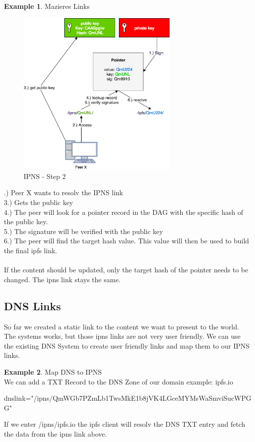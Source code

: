 \documentclass[a4paper,11pt, oneside]{report}
\theoremstyle{definition}
\newtheorem{exmp}{Example}[subsection]
\begin{document}
\begin{exmp}{Mazieres Links}
\begin{figure}[H]
\centering
\includegraphics[width=0.7\textwidth]{img/ipns-2.png}
\caption[IPNS Step 2]{IPNS - Step 2}
\end{figure}
.) Peer X wants to resolv the IPNS link\\
3.) Gets the public key\\
4.) The peer will look for a pointer record in the DAG with the specific hash of the public key. \\
5.) The signature will be verified with the public key\\
6.) The peer will find the target hash value. This value will then be used to build the final ipfs link. \\ \\
If the content should be updated, only the target hash of the pointer needs to be changed. The ipns link stays the same.


\end{exmp}

\newpage
\subsection{DNS Links}
So far we created a static link to the content we want to present to the world. The systems works, but those ipns links are not very user friendly. We can use the existing DNS System to create user friendly links and map them to our IPNS links.\\
\begin{exmp} Map DNS to IPNS\\
We can add a TXT Record to the DNS Zone of our domain example: ipfs.io \cite{DNS}
\begin{center}
	dnslink="/ipns/QmWGb7PZmLb1TwsMkE1b8jVK4LGceMYMsWaSmviSucWPGG"
\end{center}
If we enter /ipns/ipfs.io the ipfs client will resolv the DNS TXT  entry and fetch the data from the ipns link above.
\end{exmp}
\end{document}
